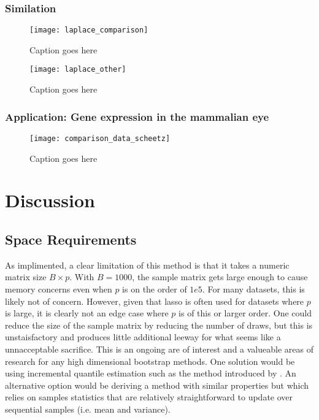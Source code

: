 \subsubsection{Similation}

\begin{figure}
  \texttt{[image: laplace\_comparison]}
  \caption{\label{Fig:laplace_comparison} Caption goes here}
\end{figure}


\begin{figure}
  \texttt{[image: laplace\_other]}
  \caption{\label{Fig:laplace_other} Caption goes here}
\end{figure}


\subsubsection{Application: Gene expression in the mammalian eye}

\begin{figure}
  \texttt{[image: comparison\_data\_scheetz]}
  \caption{\label{Fig:comparison_data_scheetz} Caption goes here}
\end{figure}

\section{Discussion}

\subsection{Space Requirements}

As implimented, a clear limitation of this method is that it takes a numeric matrix size $B \times p$. With $B = 1000$, the sample matrix gets large enough to cause memory concerns even when $p$ is on the order of $1e5$. For many datasets, this is likely not of concern. However, given that lasso is often used for datasets where $p$ is large, it is clearly not an edge case where $p$ is of this or larger order. One could reduce the size of the sample matrix by reducing the number of draws, but this is unstaisfactory and produces little additional leeway for what seems like a unnacceptable sacrifice. This is an ongoing are of interest and a valueable areas of research for any high dimensional bootstrap methods. One solution would be using incremental quantile estimation such as the method introduced by \cite{Tierney1983}. An alternative option would be deriving a method with similar properties but which relies on samples statistics that are relatively straightforward to update over sequential samples (i.e. mean and variance).

